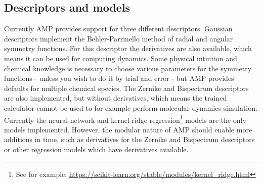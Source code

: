 \subsection{Descriptors and models}
Currently AMP provides support for three different descriptors.
Gaussian descriptors implement the Behler-Parrinello method
of radial and angular symmetry functions. For this descriptor
the derivatives are also available, which means it can be used
for computing dynamics. Some physical intuition and chemical knowledge
is necessary to choose various parameters for the symmetry functions -
unless you wish to do it by trial and error - but AMP provides
defaults for multiple chemical species.
The Zernike and Bispectrum descriptors are also implemented,
but without derivatives, which means the trained calculator
cannot be used to for example perform molecular dynamics simulation.
Currently the neural network and kernel ridge regression\footnote{
    See for example: \url{
        https://scikit-learn.org/stable/modules/kernel_ridge.html}}
models are the only models implemented.
However, the modular nature of AMP should enable more additions
in time, such as derivatives for the Zernike and Bispectrum descriptors
or other regression models which have derivatives available.
